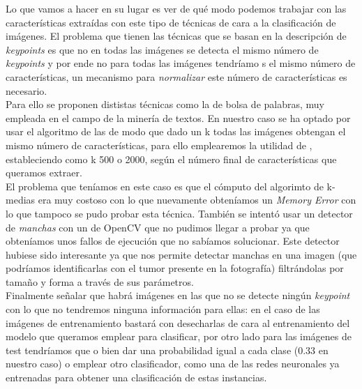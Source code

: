 Lo que vamos a hacer en su lugar es ver de qué modo podemos trabajar con las características extraídas con este tipo de técnicas de cara a la clasificación de imágenes. El problema que tienen las técnicas que se basan en la descripción de \textit{keypoints} es que no en todas las imágenes se detecta el mismo número de \textit{keypoints} y por ende no para todas las imágenes tendríamo
s el mismo número de características, un mecanismo para \textit{normalizar} este número de características es necesario.\\

Para ello se proponen dististas técnicas como la de bolsa de palabras, muy empleada en el campo de la minería de textos. En nuestro caso se ha optado por usar el algoritmo de las  de modo que dado un k todas las imágenes obtengan el mismo número de características, para ello emplearemos la utilidad de  , estableciendo como k 500 o 2000, según el número final de características que queramos extraer.\\

El problema que teníamos en este caso es que el cómputo del algorimto de k-medias era muy costoso con lo que nuevamente obteníamos un \textit{Memory Error} con lo que tampoco se pudo probar esta técnica. También se intentó usar un detector de \textit{manchas} con un  de OpenCV que no pudimos llegar a probar ya que obteníamos unos fallos de ejecución que no sabíamos solucionar. Este detector hubiese sido interesante ya que nos permite detectar manchas en una imagen (que podríamos identificarlas con el tumor presente en la fotografía) filtrándolas por tamaño y forma a través de sus parámetros.\\

Finalmente señalar que habrá imágenes en las que no se detecte ningún \textit{keypoint} con lo que no tendremos ninguna información para ellas: en el caso de las imágenes de entrenamiento bastará con desecharlas de cara al entrenamiento del modelo que queramos emplear para clasificar, por otro lado para las imágenes de test tendríamos que o bien dar una probabilidad igual a cada clase (0.33 en nuestro caso) o emplear otro clasificador, como una de las redes neuronales ya entrenadas para obtener una clasificación de estas instancias.
